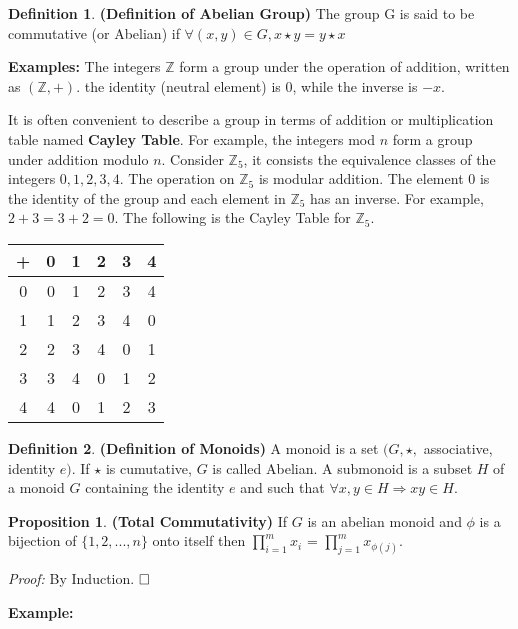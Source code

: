 \documentclass[12pt,openany]{book}
\theoremstyle{definition}
\newtheorem{defi}{Definition}[section]
\newtheorem{proposition}{Proposition}[section]
\theoremstyle{definition}
\begin{document}
\begin{defi}
\textbf{(Definition of Abelian Group)} The group G is said to be commutative (or Abelian) if $\forall (x,y) \in G, x \star y = y \star x$

\noindent\textbf{Examples:} The integers $\mathbb{Z}$ form a group under the operation of addition, written as $(\mathbb{Z}, +)$. the identity (neutral element) is $0$, while the inverse is $-x$.
\end{defi}

\noindent It is often convenient to describe a group in terms of addition or multiplication table named \textbf{Cayley Table}. For example, the integers mod $n$ form a group under addition modulo $n$. Consider $\mathbb{Z}_5$, it consists the equivalence classes of the integers $0,1,2,3,4$. The operation on $\mathbb{Z}_5$ is modular addition. The element $0$ is the identity of the group and each element in $\mathbb{Z}_5$ has an inverse. For example, $2+3 = 3+2 = 0$. The following is the Cayley Table for $\mathbb{Z}_5$.

\begin{center}
\begin{tabular}{ |c|c|c|c|c|c| } 
\hline
+ & 0 & 1 & 2 & 3 & 4 \\
\hline
0 & 0 & 1 & 2 & 3 & 4 \\ 
1 & 1 & 2 & 3 & 4 & 0 \\ 
2 & 2 & 3 & 4 & 0 & 1 \\ 
3 & 3 & 4 & 0 & 1 & 2 \\ 
4 & 4 & 0 & 1 & 2 & 3 \\
\hline
\end{tabular}
\end{center}

\begin{defi}
\textbf{(Definition of Monoids)} A monoid is a set $(G, \star,$ associative, identity $e)$. If $\star$ is cumutative, $G$ is called Abelian. A submonoid is a subset $H$ of a monoid $G$ containing the identity $e$ and such that $\forall x, y \in H \Rightarrow xy \in H $.
\end{defi}

\begin{proposition}
\textbf{(Total Commutativity)} If $G$ is an abelian monoid and $\phi$ is a bijection of $\{1,2,...,n\}$ onto itself then $\prod^{m}_{i=1}x_i$ = $\prod^{m}_{j=1}x_{\phi(j)}$.
\end{proposition}
\textit{Proof:} By Induction. $\hfill \square$

\noindent\textbf{Example:}
\end{document}
